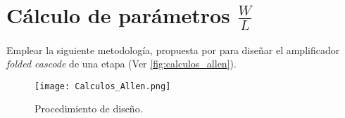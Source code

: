 \section{Cálculo de parámetros $\frac{W}{L}$ \label{sec:s3}}

\begin{center}
	\begin{minipage}{12cm}
		\begin{tcolorbox}[title=Actividad 2]
			Emplear la siguiente metodología, propuesta por \cite{Allen_2012} para diseñar el amplificador \textit{folded cascode} de una etapa (Ver \autoref{fig:calculos_allen}).
		\end{tcolorbox}	
	\end{minipage}
\end{center}

\begin{figure}[H]
	\centering
	\texttt{[image: Calculos\_Allen.png]}
	\caption{Procedimiento de diseño. \label{fig:calculos_allen}}
\end{figure}

